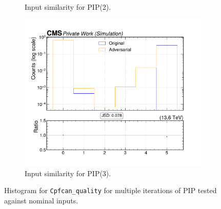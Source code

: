 \begin{figure}[htbp]
\begin{subfigure}[t]{0.32\textwidth}
    \caption{Input similarity for PIP(2).}
  \end{subfigure}\hfill
  \begin{subfigure}[t]{0.32\textwidth}
    \includegraphics[width=\linewidth]{media/output/features/compare/intprob_3/cmp_cpf_arr_Cpfcan_quality.pdf}
    \caption{Input similarity for PIP(3).}
  \end{subfigure}

  \caption{Histogram for \texttt{Cpfcan\_quality} for multiple iterations of PIP tested against nominal inputs.}
  \label{fig:intprob_input_Cpfcan_quality}
\end{figure}
